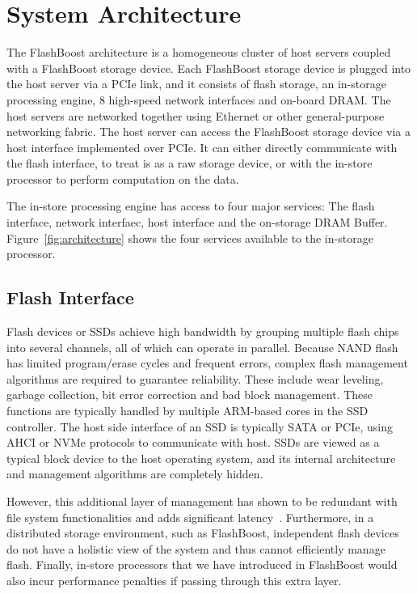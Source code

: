 \section{System Architecture}
\label{sec:architecture}

The FlashBoost architecture is a homogeneous cluster of host servers coupled
with a FlashBoost storage device. Each FlashBoost storage device is plugged into
the host server via a PCIe link, and it consists of flash storage, an in-storage
processing engine, 8 high-speed network interfaces and on-board DRAM. The host
servers are networked together using Ethernet or other general-purpose
networking fabric. The host server can access the FlashBoost storage device via
a host interface implemented over PCIe. It can either directly communicate with
the flash interface, to treat is as a raw storage device, or with the in-store
processor to perform computation on the data.

The in-store processing engine has access to four major services: The flash
interface, network interfaec, host interface and the on-storage DRAM Buffer.
Figure~\ref{fig:architecture} shows the four services available to the
in-storage processor.

\subsection{Flash Interface}

Flash devices or SSDs achieve high bandwidth by grouping multiple flash chips
into several channels, all of which can operate in parallel. Because NAND flash
has limited program/erase cycles and frequent errors, complex flash management
algorithms are required to guarantee reliability. These include wear leveling,
garbage collection, bit error correction and bad block management. These
functions are typically handled by multiple ARM-based cores in the SSD
controller. The host side interface of an SSD is typically SATA or PCIe, using
AHCI or NVMe protocols to communicate with host. SSDs are viewed
as a typical block device to the host operating system, and its internal
architecture and management algorithms are completely hidden. 

However, this additional layer of management has shown to be redundant with
file system functionalities and adds significant latency~\cite{redo}.
Furthermore, in a distributed storage environment, such as FlashBoost,
independent flash devices do not have a holistic view of the system and thus
cannot efficiently manage flash. Finally, in-store processors that we have
introduced in FlashBoost would also incur performance penalties if passing
through this extra layer. 


